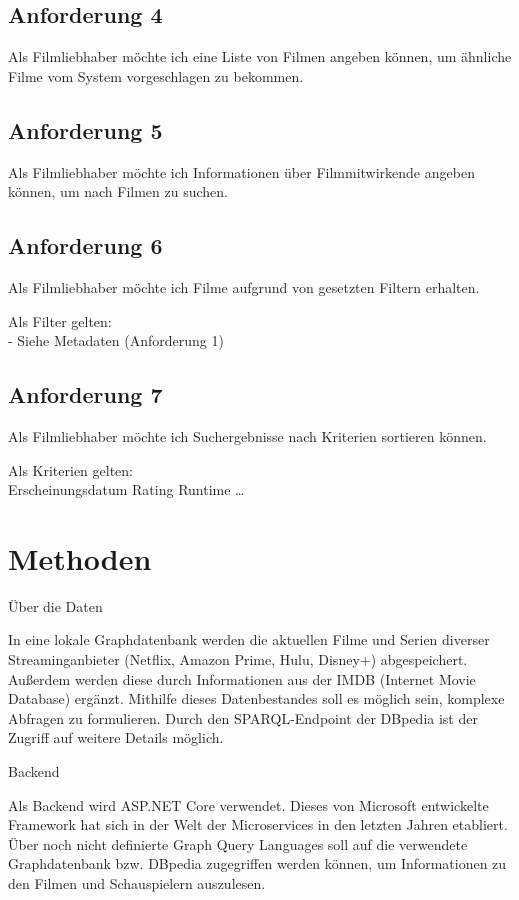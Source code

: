 \documentclass[conference]{IEEEtran}
\begin{document}
\subsection{Anforderung 4}

Als Filmliebhaber möchte ich eine Liste von Filmen angeben können,
um ähnliche Filme vom System vorgeschlagen zu bekommen.


\subsection{Anforderung 5}
Als Filmliebhaber möchte ich Informationen über Filmmitwirkende angeben können,
um nach Filmen zu suchen.

\subsection{Anforderung 6}

Als Filmliebhaber möchte ich Filme aufgrund von gesetzten Filtern erhalten.

Als Filter gelten:
\\
- Siehe Metadaten (Anforderung 1)

\subsection{Anforderung 7}

Als Filmliebhaber möchte ich Suchergebnisse nach Kriterien sortieren können.

Als Kriterien gelten:
\\
Erscheinungsdatum
Rating
Runtime
\dots
\\

\section{Methoden}

Über die Daten

In eine lokale Graphdatenbank werden die aktuellen Filme und Serien diverser Streaminganbieter (Netflix, Amazon Prime, Hulu, Disney+) abgespeichert. Außerdem werden diese durch Informationen aus der IMDB (Internet Movie Database) ergänzt. Mithilfe dieses Datenbestandes soll es möglich sein, komplexe Abfragen zu formulieren. Durch den SPARQL-Endpoint der DBpedia ist der Zugriff auf weitere Details möglich.

Backend

Als Backend wird ASP.NET Core verwendet. Dieses von Microsoft entwickelte Framework hat sich in der Welt der Microservices in den letzten Jahren etabliert. Über noch nicht definierte Graph Query Languages soll auf die verwendete Graphdatenbank bzw. DBpedia zugegriffen werden können, um Informationen zu den Filmen und Schauspielern auszulesen.
\end{document}

